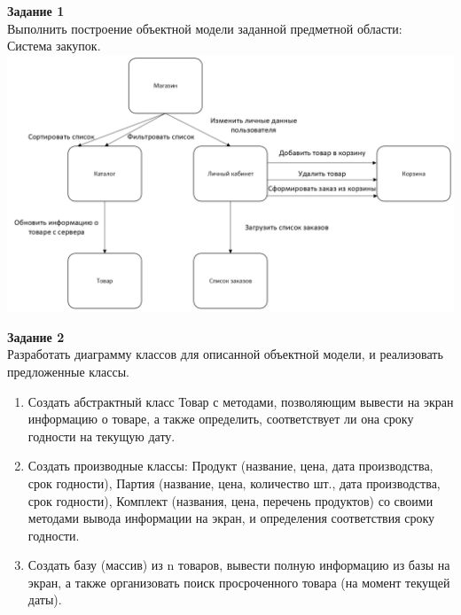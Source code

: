\documentclass[a4paper,14pt]{extarticle}
\begin{document}
\textbf{Задание 1}\\
Выполнить построение объектной модели заданной предметной области:\\
Система закупок.\\
\includegraphics[width=190mm]{task1}

\textbf{Задание 2}\\
Разработать
диаграмму классов для описанной объектной модели,
и реализовать предложенные классы.

\begin{enumerate}[1. ]
    \item Создать абстрактный класс Товар с методами, позволяющим вывести на
    экран информацию о товаре, а также определить, соответствует ли она
    сроку годности на текущую дату.
    \item Создать производные классы: Продукт (название, цена, дата
    производства, срок годности), Партия (название, цена, количество шт.,
    дата производства, срок годности), Комплект (названия, цена, перечень
    продуктов) со своими методами вывода информации на экран, и
    определения соответствия сроку годности.
    \item Создать базу (массив) из n товаров, вывести полную информацию из
    базы на экран, а также организовать поиск просроченного товара (на
    момент текущей даты).
\end{enumerate}
\end{document}
